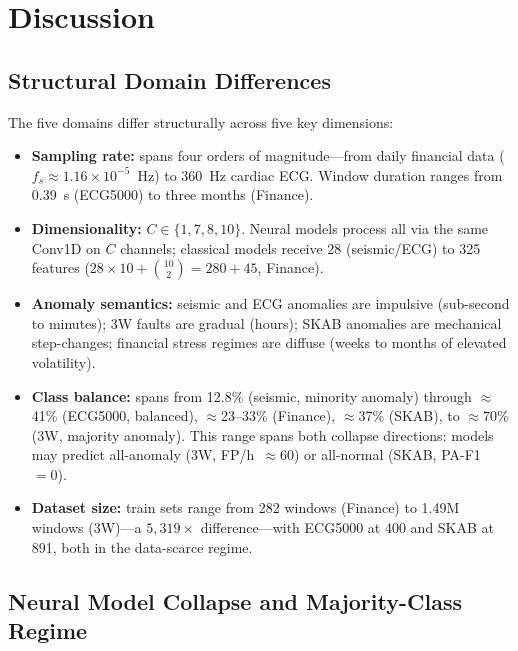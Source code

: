 \documentclass[conference]{IEEEtran}
\def\texttt#1{#1}%
\begin{document}
\section{Discussion}
\label{sec:discussion}

\subsection{Structural Domain Differences}

The five domains differ structurally across five key dimensions:

\begin{itemize}
  \item \textbf{Sampling rate:} spans four orders of magnitude---from daily
        financial data ($f_s \approx 1.16 \times 10^{-5}$~Hz) to 360~Hz cardiac
        ECG. Window duration ranges from 0.39~s (ECG5000) to three months (Finance).
  \item \textbf{Dimensionality:} $C \in \{1, 7, 8, 10\}$.
        Neural models process all via the same \texttt{Conv1D} on $C$ channels;
        classical models receive 28 (seismic/ECG) to 325 features
        ($28 \times 10 + \binom{10}{2} = 280 + 45$, Finance).
  \item \textbf{Anomaly semantics:} seismic and ECG anomalies are
        impulsive (sub-second to minutes); 3W faults are gradual (hours);
        SKAB anomalies are mechanical step-changes; financial stress regimes
        are diffuse (weeks to months of elevated volatility).
  \item \textbf{Class balance:} spans from 12.8\% (seismic, minority anomaly)
        through $\approx$41\% (ECG5000, balanced), $\approx$23--33\% (Finance),
        $\approx$37\% (SKAB), to $\approx$70\% (3W, majority anomaly).
        This range spans both collapse directions: models may predict all-anomaly
        (3W, FP/h~$\approx60$) or all-normal (SKAB, PA-F1~$=0$).
  \item \textbf{Dataset size:} train sets range from 282 windows (Finance) to
        1.49M windows (3W)---a $5{,}319\times$ difference---with ECG5000 at 400
        and SKAB at 891, both in the data-scarce regime.
\end{itemize}

\subsection{Neural Model Collapse and Majority-Class Regime}
\end{document}
